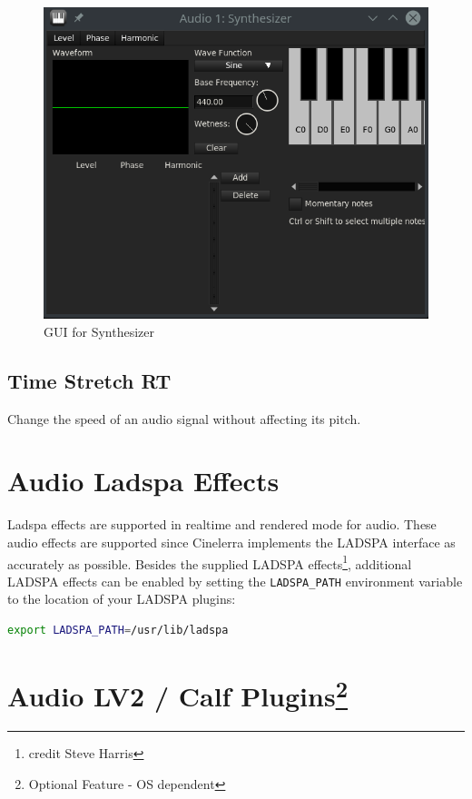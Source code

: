 \begin{figure}[htpb]
    \centering
    \includegraphics[width=0.7\linewidth]{images/synthesizer.png}
    \caption{GUI for Synthesizer}
    \label{fig:synthesizer}
\end{figure}

\subsection{Time Stretch RT}%
\label{sub:time_stretch_rt}

Change the speed of an audio signal without affecting its pitch.

\section{Audio Ladspa Effects}%
\label{sec:audio_ladspa_effects}

Ladspa effects are supported in realtime and rendered mode for audio. These audio effects are supported since Cinelerra implements the LADSPA interface as accurately as possible. Besides the supplied LADSPA effects\protect\footnote{credit Steve Harris}, additional LADSPA effects can be enabled by setting the \texttt{LADSPA\_PATH} environment variable to the location of your LADSPA plugins:

\begin{lstlisting}[language=Bash]
export LADSPA_PATH=/usr/lib/ladspa
\end{lstlisting}

\section[Audio LV2 / Calf Plugins]{Audio LV2 / Calf Plugins\protect\footnote{Optional Feature - OS dependent}}%
\label{sec:audio_lv2_calf_plugins}

